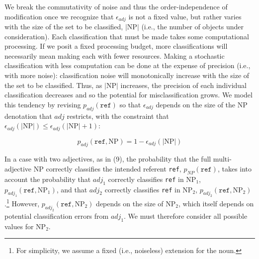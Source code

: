 \documentclass{sp}
\newcommand{\gcs}[1]{\textcolor{blue}{[gcs: #1]}}
\begin{document}
We break the commutativity of noise and thus the order-independence of modification once we recognize that $\epsilon_{adj}$ is not a fixed value, but rather varies with the size of the set to be classified, $|\textrm{NP}|$ (i.e., the number of objects under consideration). Each classification that must be made takes some computational processing. If we posit a fixed processing budget, more classifications will necessarily mean making each with fewer resources. Making a stochastic classification with less computation can be done at the expense of precision (i.e., with more noise): classification noise will monotonically increase with the size of the set to be classified.
Thus, as $|\textrm{NP}|$ increases, the precision of each individual classification decreases and so the potential for misclassification grows. We model this tendency by revising $p_{adj}(\texttt{ref})$ so that $\epsilon_{adj}$ depends on the size of the NP denotation that $adj$ restricts, with the constraint that $\epsilon_{adj}(|\textrm{NP}|) \leq \epsilon_{adj}(|\textrm{NP}|+1)$:

\begin{equation}
p_{adj}(\texttt{ref},\textrm{NP}) = 1-\epsilon_{adj}(|\textrm{NP}|)
\end{equation}


In a case with two adjectives, as in (9), the probability that the full multi-adjective NP correctly classifies the intended referent \texttt{ref}, $p_{N\!P}(\texttt{ref})$, takes into account the probability that $adj_1$ correctly classifies \texttt{ref} in NP$_1$, $p_{adj_1}(\texttt{ref},\textrm{NP}_1)$, and that $adj_2$ correctly classifies \texttt{ref} in NP$_2$, $p_{adj_2}(\texttt{ref},\textrm{NP}_2)$.\footnote{For simplicity, we assume a fixed (i.e., noiseless) extension for the noun.} However, $p_{adj_2}(\texttt{ref},\textrm{NP}_2)$ depends on the size of NP$_2$, which itself depends on potential classification errors from $adj_1$. We must therefore consider all possible values for NP$_2$.
\end{document}
